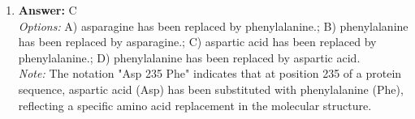 \documentclass[12pt]{article}
\begin{document}
\begin{enumerate}[label=\arabic*.]
\\ \textit{Note:} Older women, particularly those of Asian descent, are at a higher risk for osteoporosis due to factors such as lower bone density, hormonal changes after menopause, and genetic predisposition.
\item \textbf{Answer:} C
\\ \textit{Options:} A) asparagine has been replaced by phenylalanine.; B) phenylalanine has been replaced by asparagine.; C) aspartic acid has been replaced by phenylalanine.; D) phenylalanine has been replaced by aspartic acid.
\\ \textit{Note:} The notation "Asp 235 Phe" indicates that at position 235 of a protein sequence, aspartic acid (Asp) has been substituted with phenylalanine (Phe), reflecting a specific amino acid replacement in the molecular structure.
\end{enumerate}
\end{document}

